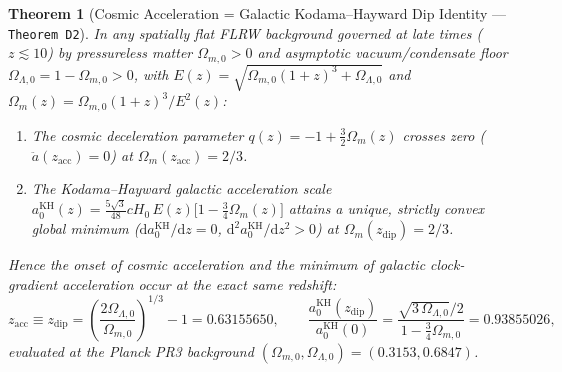 \documentclass[11pt,a4paper]{article}
\newtheorem{theorem}{Theorem}[section]
\theoremstyle{remark}
\begin{document}
\begin{theorem}[Cosmic Acceleration = Galactic Kodama--Hayward Dip Identity --- \texttt{Theorem D2}]
\label{thm:d2}
In any spatially flat FLRW background governed at late times ($z \lesssim 10$) by pressureless matter $\Omega_{m,0} > 0$ and asymptotic vacuum/condensate floor $\Omega_{\Lambda,0} = 1 - \Omega_{m,0} > 0$, with $E(z) = \sqrt{\Omega_{m,0}(1+z)^3 + \Omega_{\Lambda,0}}$ and $\Omega_m(z) = \Omega_{m,0}(1+z)^3 / E^2(z)$:
\begin{enumerate}
  \item The cosmic deceleration parameter $q(z) = -1 + \frac{3}{2}\Omega_m(z)$ crosses zero ($\ddot{a}(z_{\mathrm{acc}}) = 0$) at $\Omega_m(z_{\mathrm{acc}}) = 2/3$.
  \item The Kodama--Hayward galactic acceleration scale $a_0^{\mathrm{KH}}(z) = \frac{5\sqrt{3}}{48}cH_0\,E(z)\bigl[1 - \frac{3}{4}\Omega_m(z)\bigr]$ attains a unique, strictly convex global minimum ($\mathrm{d}a_0^{\mathrm{KH}}/\mathrm{d}z = 0$, $\mathrm{d}^2 a_0^{\mathrm{KH}}/\mathrm{d}z^2 > 0$) at $\Omega_m(z_{\mathrm{dip}}) = 2/3$.
\end{enumerate}
Hence the onset of cosmic acceleration and the minimum of galactic clock-gradient acceleration occur at the \emph{exact same redshift}:
\begin{equation}
  z_{\mathrm{acc}} \equiv z_{\mathrm{dip}} = \left(\frac{2\Omega_{\Lambda,0}}{\Omega_{m,0}}\right)^{1/3} - 1 = 0.63155650, \qquad
  \frac{a_0^{\mathrm{KH}}(z_{\mathrm{dip}})}{a_0^{\mathrm{KH}}(0)} = \frac{\sqrt{3\,\Omega_{\Lambda,0}}/2}{1 - \frac{3}{4}\Omega_{m,0}} = 0.93855026,
  \label{eq:z_acc_equals_z_dip}
\end{equation}
evaluated at the Planck PR3 background $(\Omega_{m,0}, \Omega_{\Lambda,0}) = (0.3153, 0.6847)$.
\end{theorem}
\end{document}
